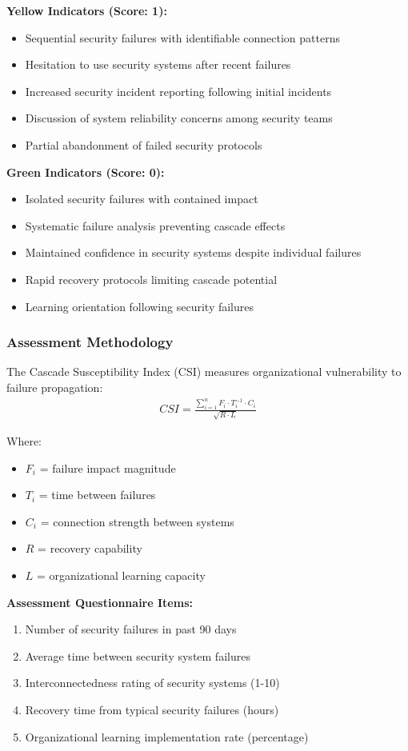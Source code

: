 \documentclass[11pt,a4paper]{article}
\begin{document}
\textbf{Yellow Indicators (Score: 1):}
\begin{itemize}
\item Sequential security failures with identifiable connection patterns
\item Hesitation to use security systems after recent failures
\item Increased security incident reporting following initial incidents
\item Discussion of system reliability concerns among security teams
\item Partial abandonment of failed security protocols
\end{itemize}

\textbf{Green Indicators (Score: 0):}
\begin{itemize}
\item Isolated security failures with contained impact
\item Systematic failure analysis preventing cascade effects
\item Maintained confidence in security systems despite individual failures
\item Rapid recovery protocols limiting cascade potential
\item Learning orientation following security failures
\end{itemize}

\subsubsection{Assessment Methodology}

The Cascade Susceptibility Index (CSI) measures organizational vulnerability to failure propagation:
\begin{align}
CSI = \frac{\sum_{i=1}^{n} F_i \cdot T_i^{-1} \cdot C_i}{\sqrt{R \cdot L}}
\end{align}

Where:
\begin{itemize}
\item $F_i$ = failure impact magnitude
\item $T_i$ = time between failures
\item $C_i$ = connection strength between systems
\item $R$ = recovery capability
\item $L$ = organizational learning capacity
\end{itemize}

\textbf{Assessment Questionnaire Items:}
\begin{enumerate}
\item Number of security failures in past 90 days
\item Average time between security system failures
\item Interconnectedness rating of security systems (1-10)
\item Recovery time from typical security failures (hours)
\item Organizational learning implementation rate (percentage)
\end{enumerate}
\end{document}

